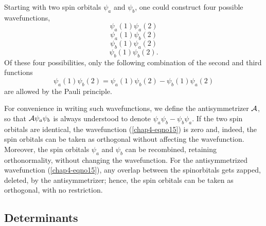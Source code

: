 Starting with two spin orbitals $\psi_a$ and $\psi_b$, one could construct 
four possible wavefunctions,
\begin{equation}
\psi_a (1) \psi_a (2)
\end{equation}
\begin{equation}
\psi_a (1) \psi_b (2)
\end{equation}
\begin{equation}
\psi_b (1) \psi_a (2)
\end{equation}
\begin{equation}
\psi_b (1) \psi_b (2) .
\end{equation}
Of these four possibilities, only the following combination of the second 
and third functions
\begin{equation}
\psi_a (1) \psi_b (2) = \psi_a (1) \psi_b (2) - \psi_b (1) \psi_a 
(2)
\label{chap4-eqno15}
\end{equation}
are allowed by the Pauli principle.

For convenience in writing such wavefunctions, we define the
antisymmetrizer ${\cal A}$, so that ${\cal A} \psi_a \psi_b$ is always
understood to denote $\psi_a \psi_b - \psi_b \psi_a$.  If the two spin
orbitals are identical, the wavefunction (\ref{chap4-eqno15}) is zero
and, indeed, the spin orbitals can be taken as orthogonal without
affecting the wavefunction.  Moreover, the spin orbitals $\psi_a$ and
$\psi_b$ can be recombined, retaining orthonormality, without changing
the wavefunction.  For the antisymmetrized wavefunction
(\ref{chap4-eqno15}), any overlap between the spinorbitals gets
zapped, deleted, by the antisymmetrizer; hence, the spin orbitals can
be taken as orthogonal, with no restriction.

\subsection{Determinants}

